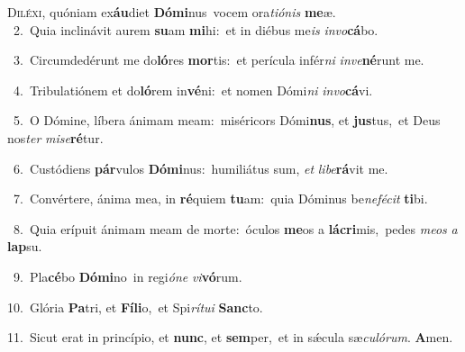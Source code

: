 \lettrine{\initial\textcolor{\initialcolor}{D}}{iléxi,} quóniam ex\-\textbf{áu}\-diet \textbf{Dó}\-\textbf{mi}nus~\star vocem ora\-\textit{ti}\-\textit{ó}\textit{nis} \textbf{me}\-æ.\\
{\numbfont\textcolor{\numbcolor}{~2.}}~Quia inclinávit aurem \textbf{su}\-am \textbf{mi}\-hi:~\star et in diébus me\textit{is} \textit{in}\-\textit{vo}\textbf{cá}bo.\par
{\numbfont\textcolor{\numbcolor}{~3.}}~Circumdedérunt me do\-\textbf{ló}\-res \textbf{mor}\-tis:~\star et perícula infér\textit{ni} \textit{in}\-\textit{ve}\textbf{né}runt me.\par
{\numbfont\textcolor{\numbcolor}{~4.}}~Tribulatiónem et do\-\textbf{ló}\-rem in\-\textbf{vé}\-ni:~\star et nomen Dómi\textit{ni} \textit{in}\-\textit{vo}\textbf{cá}vi.\par
{\numbfont\textcolor{\numbcolor}{~5.}}~O Dómine, líbera ánimam meam:~\dagger miséricors Dómi\-\textbf{nus}\-, et \textbf{jus}\-tus,~\star et Deus nos\textit{ter} \textit{mi}\-\textit{se}\textbf{ré}tur.\par
{\numbfont\textcolor{\numbcolor}{~6.}}~Custódiens \textbf{pár}\-vulos \textbf{Dó}\-\textbf{mi}nus:~\star humiliátus sum, \textit{et} \textit{li}\-\textit{be}\textbf{rá}vit me.\par
{\numbfont\textcolor{\numbcolor}{~7.}}~Convértere, ánima mea, in \textbf{ré}\-quiem \textbf{tu}\-am:~\star quia Dóminus be\-\textit{ne}\-\textit{fé}\textit{cit} \textbf{ti}\-bi.\par
{\numbfont\textcolor{\numbcolor}{~8.}}~Quia erípuit ánimam meam de morte:~\dagger óculos \textbf{me}\-os a \textbf{lá}\-\textbf{cri}mis,~\star pedes \textit{me}\-\textit{os} \textit{a} \textbf{lap}\-su.\par
{\numbfont\textcolor{\numbcolor}{~9.}}~Pla\-\textbf{cé}\-bo \textbf{Dó}\-\textbf{mi}no~\star in regi\-\textit{ó}\-\textit{ne} \textit{vi}\-\textbf{vó}rum.\par
{\numbfont\textcolor{\numbcolor}{10.}}~Glória \textbf{Pa}\-tri, et \textbf{Fí}\-\textbf{li}o,~\star et Spi\-\textit{rí}\-\textit{tu}\textit{i} \textbf{Sanc}\-to.\par
{\numbfont\textcolor{\numbcolor}{11.}}~Sicut erat in princípio, et \textbf{nunc}\-, et \textbf{sem}\-per,~\star et in sǽcula sæ\-\textit{cu}\-\textit{ló}\textit{rum}. \textbf{A}\-men.\par
